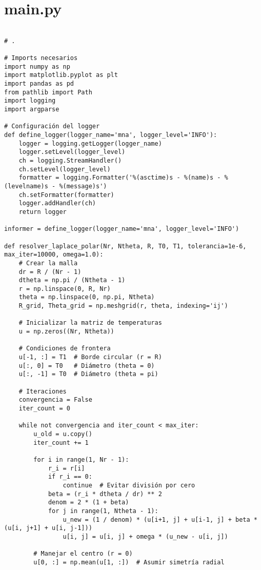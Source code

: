 \chapter{main.py}\label{apendice:a}

\begin{verbatim}

# .

# Imports necesarios
import numpy as np
import matplotlib.pyplot as plt
import pandas as pd
from pathlib import Path
import logging
import argparse

# Configuración del logger
def define_logger(logger_name='mna', logger_level='INFO'):
    logger = logging.getLogger(logger_name)
    logger.setLevel(logger_level)
    ch = logging.StreamHandler()
    ch.setLevel(logger_level)
    formatter = logging.Formatter('%(asctime)s - %(name)s - %(levelname)s - %(message)s')
    ch.setFormatter(formatter)
    logger.addHandler(ch)
    return logger

informer = define_logger(logger_name='mna', logger_level='INFO')

def resolver_laplace_polar(Nr, Ntheta, R, T0, T1, tolerancia=1e-6, max_iter=10000, omega=1.0):
    # Crear la malla
    dr = R / (Nr - 1)
    dtheta = np.pi / (Ntheta - 1)
    r = np.linspace(0, R, Nr)
    theta = np.linspace(0, np.pi, Ntheta)
    R_grid, Theta_grid = np.meshgrid(r, theta, indexing='ij')

    # Inicializar la matriz de temperaturas
    u = np.zeros((Nr, Ntheta))

    # Condiciones de frontera
    u[-1, :] = T1  # Borde circular (r = R)
    u[:, 0] = T0   # Diámetro (theta = 0)
    u[:, -1] = T0  # Diámetro (theta = pi)

    # Iteraciones
    convergencia = False
    iter_count = 0

    while not convergencia and iter_count < max_iter:
        u_old = u.copy()
        iter_count += 1

        for i in range(1, Nr - 1):
            r_i = r[i]
            if r_i == 0:
                continue  # Evitar división por cero
            beta = (r_i * dtheta / dr) ** 2
            denom = 2 * (1 + beta)
            for j in range(1, Ntheta - 1):
                u_new = (1 / denom) * (u[i+1, j] + u[i-1, j] + beta * (u[i, j+1] + u[i, j-1]))
                u[i, j] = u[i, j] + omega * (u_new - u[i, j])

        # Manejar el centro (r = 0)
        u[0, :] = np.mean(u[1, :])  # Asumir simetría radial


\end{verbatim}
